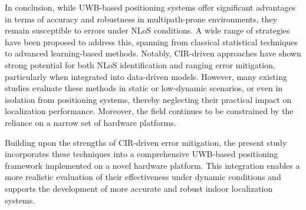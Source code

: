 In conclusion, while UWB-based positioning systems offer significant advantages in terms of accuracy and robustness in multipath-prone environments, they remain susceptible to errors under NLoS conditions. A wide range of strategies have been proposed to address this, spanning from classical statistical techniques to advanced learning-based methods. Notably, CIR-driven approaches have shown strong potential for both NLoS identification and ranging error mitigation, particularly when integrated into data-driven models. However, many existing studies evaluate these methods in static or low-dynamic scenarios, or even in isolation from positioning systems, thereby neglecting their practical impact on localization performance. Moreover, the field continues to be constrained by the reliance on a narrow set of hardware platforms.

Building upon the strengths of CIR-driven error mitigation, the present study incorporates these techniques into a comprehensive UWB-based positioning framework implemented on a novel hardware platform. This integration enables a more realistic evaluation of their effectiveness under dynamic conditions and supports the development of more accurate and robust indoor localization systems.
